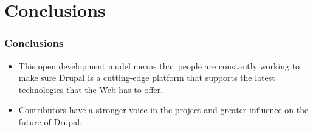 \section{Conclusions}
\begin{frame}[allowframebreaks]
\frametitle{Conclusions}

\begin{itemize}
	\item This open development model means that people are constantly working to make sure Drupal is a cutting-edge platform that supports the latest technologies that the Web has to offer. 
\item Contributors have a stronger voice in the project and greater influence on the future of Drupal.
\end{itemize}
\end{frame}
